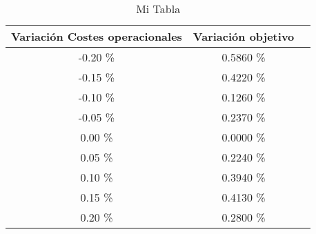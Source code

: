 \begin{table}
\centering
\begin{tabular}{|c|c|c|}
\hline
 Variación Costes operacionales & Variación objetivo \\ \hline
-0.20 \% & 0.5860 \% \\ \hline
-0.15 \% & 0.4220 \% \\ \hline
-0.10 \% & 0.1260 \% \\ \hline
-0.05 \% & 0.2370 \% \\ \hline
0.00 \% & 0.0000 \% \\ \hline
0.05 \% & 0.2240 \% \\ \hline
0.10 \% & 0.3940 \% \\ \hline
0.15 \% & 0.4130 \% \\ \hline
0.20 \% & 0.2800 \% \\ \hline
\end{tabular}
\caption{Mi Tabla}
\end{table}
